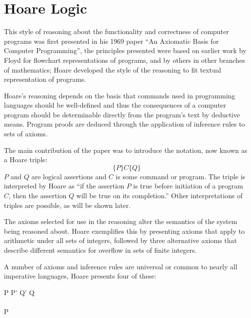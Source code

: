 \documentclass[a4paper,notitlepage]{report}
\begin{document}

\section{Hoare Logic}
  This style of reasoning about the functionality and correctness of computer
  programs was first presented in his 1969 paper ``An Axiomatic Basis for
  Computer Programming''\cite{Hoare1969Axiom}, the principles presented were
  based on earlier work by Floyd\cite{floyd1967assigning} for flowchart
  representations of programs, and by others in other branches of mathematics;
  Hoare developed the style of the reasoning to fit textual representation of
  programs.

  Hoare's reasoning depends on the basis that commands used in programming
  languages should be well-defined and thus the consequences of a computer
  program should be determinable directly from the program's text by deductive
  means. Program proofs are deduced through the application of inference rules
  to sets of axioms.

  The main contribution of the paper was to introduce the notation, now known as
  a Hoare triple:
    \[ \{P\} C \{Q\} \]
  $P$ and $Q$ are logical assertions and $C$ is some command or program. The
  triple is interpreted by Hoare as ``if the assertion $P$ is true before
  initiation of a program $C$, then the assertion $Q$ will be true on its
  completion.'' Other interpretations of triples are possible, as will be shown
  later.

  The axioms selected for use in the reasoning alter the semantics of the system
  being reasoned about. Hoare exemplifies this by presenting axioms that apply
  to arithmetic under all sets of integers, followed by three alternative axioms
  that describe different semantics for overflow in sets of finite integers.

  A number of axioms and inference rules are universal or common to nearly all
  imperative languages, Hoare presents four of these:
  \begin{display}{}
    {} \qquad

    { \quad P \impl P' \quad Q' \impl Q}
    {} \\
    \\
    {P \quad {}}
    {} \qquad

    { \quad {}}
    {}
  \end{display}
\end{document}
